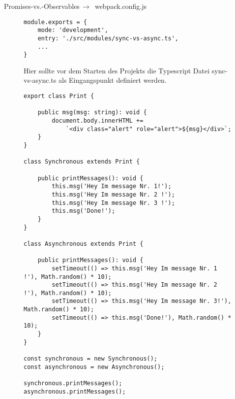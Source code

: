 \begin{center}
    Promises-vs.-Observables$\,\to\,$ webpack.config.js
\end{center}

\begin{figure}[H]
\begin{lstlisting}[basicstyle=\small]
module.exports = {
    mode: 'development',
    entry: './src/modules/sync-vs-async.ts',
    ...
}
\end{lstlisting}
\caption{Hier sollte vor dem Starten des Projekts die Typescript Datei sync-vs-async.ts als Eingangspunkt definiert werden.}
\end{figure}

\begin{figure}[H]
\begin{lstlisting}[basicstyle=\small]
export class Print {

    public msg(msg: string): void {
        document.body.innerHTML +=
            `<div class="alert" role="alert">${msg}</div>`;
    }
}

class Synchronous extends Print {

    public printMessages(): void {
        this.msg('Hey Im message Nr. 1!');
        this.msg('Hey Im message Nr. 2 !');
        this.msg('Hey Im message Nr. 3 !');
        this.msg('Done!');
    }
}

class Asynchronous extends Print {

    public printMessages(): void {
        setTimeout(() => this.msg('Hey Im message Nr. 1 !'), Math.random() * 10);
        setTimeout(() => this.msg('Hey Im message Nr. 2 !'), Math.random() * 10);
        setTimeout(() => this.msg('Hey Im message Nr. 3!'), Math.random() * 10);
        setTimeout(() => this.msg('Done!'), Math.random() * 10);
    }
}

const synchronous = new Synchronous();
const asynchronous = new Asynchronous();

synchronous.printMessages();
asynchronous.printMessages();
\end{lstlisting}
\end{figure}

